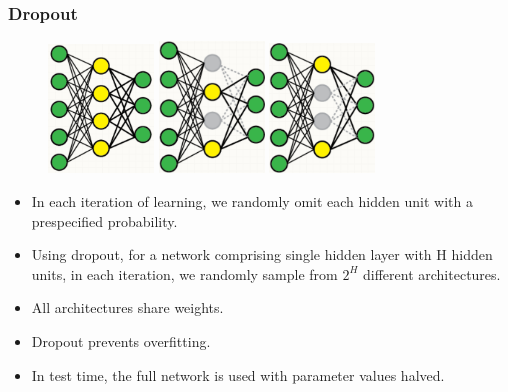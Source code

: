 \documentclass{beamer}
\begin{document}
\begin{frame}
	\frametitle{Dropout}
	\begin{figure}
		\includegraphics[width=0.25\textwidth]{./figures/edit/full_network.png}
		\hspace{1em}
		\includegraphics[width=0.25\textwidth]{./figures/edit/drop_01.png}
		\hspace{1em}		
		\includegraphics[width=0.25\textwidth]{./figures/edit/drop_02.png}		
	\end{figure}
	
	\begin{itemize}
		\item In each iteration of learning, we randomly omit each hidden unit with a prespecified probability.
		\item Using dropout, for a network comprising single hidden layer with H hidden units, in each iteration, we randomly sample from $2^H$ different architectures.
		\item All architectures share weights.
		\item Dropout prevents overfitting.
		\item In test time, the full network is used with parameter values halved.
	\end{itemize}
\end{frame}
\end{document}
